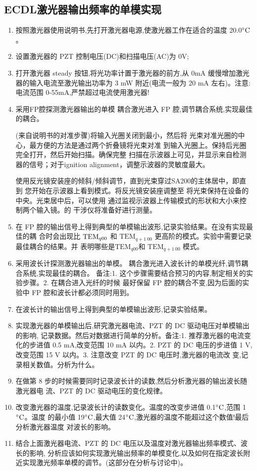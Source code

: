 \documentclass[10pt,a4paper]{ctexart}
\begin{document}
\subsection{ECDL激光器输出频率的单模实现}
\begin{enumerate}
\item  按照激光器使用说明书,先打开激光器电源,使激光器工作在适合的温度 20.0$^\circ {\rm C}$。
\item 设置激光器的 PZT 控制电压(DC)和扫描电压(AC)为 0V;
\item 打开激光器 steady 按钮,将光功率计置于激光器的前方,从 0mA 缓慢增加激光器的输入电流至激光输出功率为 3 mW 附近(电流一般为 20 mA 左右)。注意:电流范围 0-55mA,严禁超过电流使用激光器!
\item {\color{red}采用FP腔探测激光器输出的单模} 耦合激光进入 FP 腔,调节耦合系统,实现最佳的耦合。

{\color{blue} (来自说明书的对准步骤)将输入光圈关闭到最小，然后将
光束对准光圈的中心，最方便的方法是通过两个折叠镜将光束对准
到输入光圈上。保持后光圈完全打开，然后开始扫描。确保完整
扫描在示波器上可见，并显示来自检测器的信号；对于ignition alignment，调整示波器的灵敏度最大。

使用反光镜安装座的倾斜/倾斜调节，直到光束穿过SA200的主体居中，即直到
您开始在示波器上看到模式。将反光镜安装座调整至
将光束保持在设备的中央。光束居中后，可以使用
通过监视示波器上传输模式的形状和大小来控制两个输入镜。的
干涉仪将准备好进行测量。}

\item 在 FP 腔的输出信号上得到典型的单模输出波形,记录实验结果。在没有实现最佳的耦
合时会出现比 ${\rm TEM}_{q00}$ 和 $\text{TEM}_{q+1\ 00}$ 更高阶的模式。实验中需要记录最佳耦合的结果。并
表明哪些是$\text{TEM}_{q00}$和 $\text{TEM}_{q+1\ 00}$  模式。
\item  {\color{red} 采用波长计探测激光器输出的单模。} 耦合激光进入波长计的单模光纤,调节耦合系统,实现最佳的耦合。
备注:1. 这个步骤需要结合预习的内容,制定相关的实验步骤。2. 在耦合进入光纤的时候
最好保留 FP 腔的耦合不变,因为后面的实验中 FP 腔和波长计都必须同时用到。
\item 在波长计的输出信号上得到典型的单模输出波形,记录实验结果。
\item 实现激光器的单模输出后,{\color{red}研究激光器电流、PZT 的 DC 驱动电压对单模输出的影响},
记录数据。然后对数据进行简单的分析。备注:1. 推荐激光器的电流变化的步进值 0.5 mA,改变范围 10 mA 以内。2. PZT 的 DC 电压的步进值 1 V,改变范围 15 V 以内。3. 注意改变 PZT 的 DC 电压时,激光器的电流改
变,记录相关数值。分析为什么。
\item 在做第 8 步的时候需要同时记录波长计的读数,然后分析激光器的输出波长随激光器电
流、PZT 的 DC 驱动电压的变化规律。
\item 改变激光器的温度,记录波长计的读数变化。温度的改变步进值 0.1$^\circ {\rm C}$,范围 1$^\circ {\rm C}$。温度
的最小值 19$^\circ {\rm C}$,最大值 24$^\circ {\rm C}$,激光器的温度不能超过这个数值!最后分析激光器温度
对波长的影响。
\item 结合上面激光器电流、PZT 的 DC 电压以及温度对激光器输出频率模式、波长的影响,
分析应该如何实现激光输出频率的单模变化,以及如何在指定波长附近实现激光频率单模的调节。(这部分在分析与讨论中)。
\end{enumerate}
\end{document}
